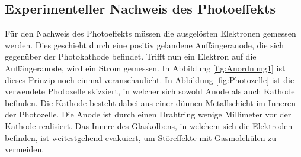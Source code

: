 \subsection{Experimenteller Nachweis des Photoeffekts}
\label{sec:nachweis}
Für den Nachweis des Photoeffekts müssen die ausgelösten Elektronen gemessen werden. Dies geschieht durch eine positiv gelandene
Auffängeranode, die sich gegenüber der Photokathode befindet. Trifft nun ein Elektron auf die Auffängeranode, wird ein Strom
gemessen. In Abbildung \ref{fig:Anordnung1} ist dieses Prinzip noch einmal veranschaulicht. In Abbildung \ref{fig:Photozelle} ist
die verwendete Photozelle skizziert, in welcher sich sowohl Anode als auch Kathode befinden. Die Kathode besteht dabei aus einer dünnen
Metallschicht im Inneren der Photozelle. Die Anode ist durch einen Drahtring wenige Millimeter vor der Kathode realisiert. Das Innere des
Glaskolbens, in welchem sich die Elektroden befinden, ist weitestgehend evakuiert, um Störeffekte mit Gasmolekülen zu vermeiden.

